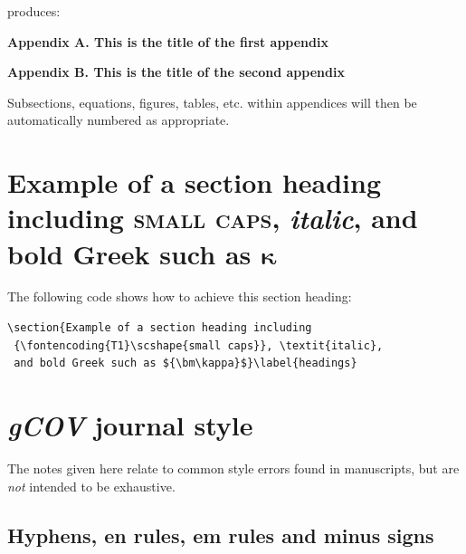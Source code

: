 \documentclass{gCOV2e}
\theoremstyle{plain}%
\theoremstyle{definition}
\theoremstyle{remark}
\begin{document}
\noindent produces:\medskip

\noindent\textbf{Appendix A. This is the title of the first appendix}\medskip

\noindent\textbf{Appendix B. This is the title of the second appendix}\medskip

\noindent Subsections, equations, figures, tables, etc. within
appendices will then be automatically numbered as appropriate.


\section{Example of a section heading including {\scshape{small caps}},
   \textit{italic}, and bold Greek such as ${\bm\kappa}$}\label{headings}

The following code shows how to achieve this section heading:
\begin{verbatim}
\section{Example of a section heading including
 {\fontencoding{T1}\scshape{small caps}}, \textit{italic},
 and bold Greek such as ${\bm\kappa}$}\label{headings}
\end{verbatim}


\section{\textit{gCOV} journal style}

The notes given here relate to common style errors found in manuscripts, but are \emph{not}
intended to be exhaustive.


\subsection{Hyphens, en rules, em rules and minus signs}\label{dashes}
\end{document}
